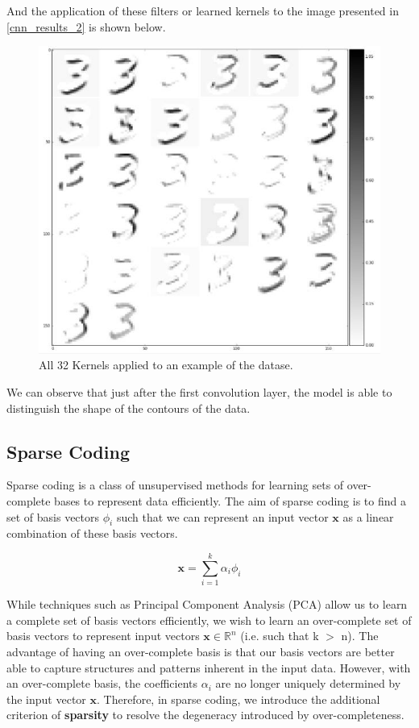 \documentclass[	DIV=calc,%
				paper=a4,%
				fontsize=11pt,%
				twocolumn]{scrartcl}	 %
\begin{document}
And the application of these filters or learned kernels to the image presented in \ref{cnn_results_2} is shown below. 

\begin{figure}[H]
    \centering
    \includegraphics[width=0.8\linewidth]{data/cnn_results_4.png}
    \caption{All 32 Kernels applied to an example of the datase.}
    \label{cnn_results_4.png}
\end{figure}

We can observe that just after the first convolution layer, the model is able to distinguish the shape of the contours of the data. 

\subsection*{Sparse Coding}
Sparse coding is a class of unsupervised methods for learning sets of over-complete bases to represent data efficiently. The aim of sparse coding is to find a set of basis vectors $\phi_{i}$ such that we can represent an input vector $\mathbf{x}$ as a linear combination of these basis vectors. \cite{ufldl_sparse_coding}

$$ \mathbf{x} = \sum_{i=1}^{k} \alpha_{i}\phi_{i} $$

While techniques such as Principal Component Analysis (PCA) allow us to learn a complete set of basis vectors efficiently, we wish to learn an over-complete set of basis vectors to represent input vectors $\mathbf{x}\in\mathbb{R}^n$ (i.e. such that k $>$ n). The advantage of having an over-complete basis is that our basis vectors are better able to capture structures and patterns inherent in the input data. However, with an over-complete basis, the coefficients $\alpha_{i}$ are no longer uniquely determined by the input vector $\mathbf{x}$. Therefore, in sparse coding, we introduce the additional criterion of \textbf{sparsity} to resolve the degeneracy introduced by over-completeness.
\end{document}
